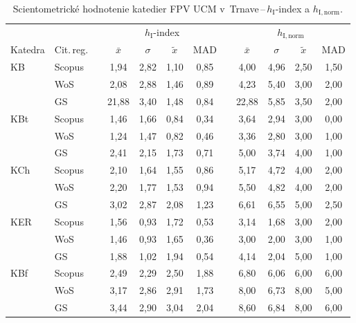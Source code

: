 \begin{table}
  \centering\small
  \caption[Hodnotenie FPV\,--\,$h_{\mathrm{I}}$-index a $h_{\mathrm{I,norm}}$]%
  {Scientometrické hodnotenie katedier FPV UCM v~Trnave\,--\,$h_{\mathrm{I}}$-index a $h_{\mathrm{I,norm}}$.}
  \label{tab:4-staff.results}
  \begin{tabularx}{\textwidth}{XXp{1ex}ccccp{1ex}cccc}
    \toprule
    & & & \multicolumn{4}{c}{$h_{\mathrm{I}}$-index} & & \multicolumn{4}{c}{$h_{\mathrm{I,norm}}$} \\
    \cmidrule{4-7}\cmidrule{9-12}
    Katedra & Cit.\,reg. & & $\bar{x}$ & $\sigma$ & $\tilde{x}$ & MAD & & $\bar{x}$ & $\sigma$ & $\tilde{x}$ & MAD \\
    \midrule
    KB   & Scopus & & 1,94  & 2,82 & 1,10 & 0,85 & & 4,00  & 4,96 & 2,50 & 1,50 \\
         & WoS    & & 2,08  & 2,88 & 1,46 & 0,89 & & 4,23  & 5,40 & 3,00 & 2,00 \\
         & GS     & & 21,88 & 3,40 & 1,48 & 0,84 & & 22,88 & 5,85 & 3,50 & 2,00 \\[1ex]
    KBt  & Scopus & & 1,46  & 1,66 & 0,84 & 0,34 & & 3,64  & 2,94 & 3,00 & 0,00 \\
         & WoS    & & 1,24  & 1,47 & 0,82 & 0,46 & & 3,36  & 2,80 & 3,00 & 1,00 \\
         & GS     & & 2,41  & 2,15 & 1,73 & 0,71 & & 5,00  & 3,74 & 4,00 & 1,00 \\[1ex]
    KCh  & Scopus & & 2,10  & 1,64 & 1,55 & 0,86 & & 5,17  & 4,72 & 4,00 & 2,00 \\
         & WoS    & & 2,20  & 1,77 & 1,53 & 0,94 & & 5,50  & 4,82 & 4,00 & 2,00 \\
         & GS     & & 3,02  & 2,87 & 2,08 & 1,23 & & 6,61  & 6,55 & 5,00 & 2,50 \\[1ex]
    KER  & Scopus & & 1,56  & 0,93 & 1,72 & 0,53 & & 3,14  & 1,68 & 3,00 & 2,00 \\
         & WoS    & & 1,46  & 0,93 & 1,65 & 0,36 & & 3,00  & 2,00 & 3,00 & 1,00 \\
         & GS     & & 1,88  & 1,02 & 1,94 & 0,54 & & 4,14  & 2,04 & 5,00 & 1,00 \\[1ex]
    KBf  & Scopus & & 2,49  & 2,29 & 2,50 & 1,88 & & 6,80  & 6,06 & 6,00 & 6,00 \\
         & WoS    & & 3,17  & 2,86 & 2,91 & 1,73 & & 8,00  & 6,73 & 8,00 & 5,00 \\
         & GS     & & 3,44  & 2,90 & 3,04 & 2,04 & & 8,60  & 6,84 & 8,00 & 6,00 \\[1ex]

\end{tabularx}
\end{table}
